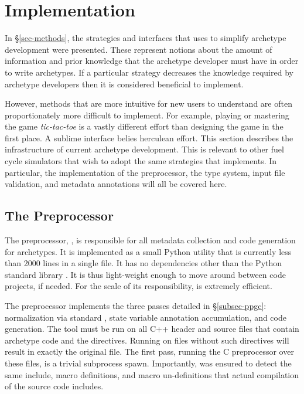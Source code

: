 \section{Implementation}
\label{sec-impl}

In \S \ref{sec-methods}, the strategies and interfaces that \Cyclus uses to 
simplify archetype development were presented. These represent notions about
the amount of information and prior knowledge that the archetype developer 
must have in order to write archetypes.  If a particular strategy 
decreases the knowledge required by archetype developers then it is considered
beneficial to implement.  

However, methods that are more intuitive for new users to understand are often
proportionately more difficult to implement. For example, playing or mastering 
the game \emph{tic-tac-toe} is a vastly different effort than
designing the game in the first place.  
A sublime interface belies 
herculean effort. This section describes the infrastructure of
current \cyclus archetype development.  This is relevant to other fuel 
cycle simulators that wish to adopt the same strategies that \cyclus 
implements. In particular, the implementation of the \cyclus preprocessor, 
the type system, input file validation, and metadata annotations will all 
be covered here.

\subsection{The \Cyclus Preprocessor}

The \cyclus preprocessor, \cycpp, is responsible for all metadata collection and 
code generation for archetypes. It is implemented as a small Python utility 
that is currently less than 2000 lines in a single file.  It has no dependencies other 
than the Python standard library \cite{lutz2010programming}. It is thus light-weight enough to move around 
between code projects, if needed. For the scale of its responsibility, \cycpp
is extremely efficient. 

The preprocessor implements the three passes detailed in \S\ref{subsec-ppgc}:
normalization via standard , state variable annotation accumulation, and code 
generation. The \cycpp tool must be run on all C++ header and source files that
contain archetype code and the  directives. Running \cycpp
on files without such directives will result in exactly the 
original file. The first \cycpp
pass, running the C preprocessor over these files, is a trivial subprocess 
spawn. Importantly, \cycpp was ensured to detect the
same include, macro definitions, and macro un-definitions that actual compilation 
of the source code includes.


